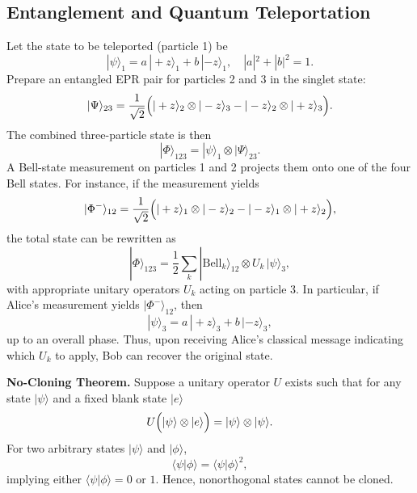 \documentclass[twocolumn]{article}
\begin{document}
\begin{spacing}{1}
\subsection{Entanglement and Quantum Teleportation}
Let the state to be teleported (particle 1) be
\[
|\psi\rangle_1 = a\,|+z\rangle_1 + b\,|-z\rangle_1,\quad |a|^2+|b|^2=1.
\]
Prepare an entangled EPR pair for particles 2 and 3 in the singlet state:
\[
|\Psi\rangle_{23} = \frac{1}{\sqrt{2}}\Bigl(|+z\rangle_2\otimes|-z\rangle_3 - |-z\rangle_2\otimes|+z\rangle_3\Bigr).
\]
The combined three-particle state is then
\[
|\Phi\rangle_{123} = |\psi\rangle_1\otimes|\Psi\rangle_{23}.
\]
A Bell-state measurement on particles 1 and 2 projects them onto one of the four Bell states. For instance, if the measurement yields
\[
|\Phi^-\rangle_{12} = \frac{1}{\sqrt{2}}\Bigl(|+z\rangle_1\otimes|-z\rangle_2 - |-z\rangle_1\otimes|+z\rangle_2\Bigr),
\]
the total state can be rewritten as
\[
|\Phi\rangle_{123} = \frac{1}{2}\sum_{k} |\text{Bell}_k\rangle_{12}\otimes U_k\,|\psi\rangle_3,
\]
with appropriate unitary operators \(U_k\) acting on particle 3. In particular, if Alice's measurement yields \(|\Phi^-\rangle_{12}\), then
\[
|\psi\rangle_3 = a\,|+z\rangle_3 + b\,|-z\rangle_3,
\]
up to an overall phase. Thus, upon receiving Alice’s classical message indicating which \(U_k\) to apply, Bob can recover the original state.

\textbf{No-Cloning Theorem.} Suppose a unitary operator \(U\) exists such that for any state \(|\psi\rangle\) and a fixed blank state \(|e\rangle\)
\[
U\Bigl(|\psi\rangle\otimes|e\rangle\Bigr)=|\psi\rangle\otimes|\psi\rangle.
\]
For two arbitrary states \(|\psi\rangle\) and \(|\phi\rangle\),
\[
\langle\psi|\phi\rangle = \langle\psi|\phi\rangle^2,
\]
implying either \(\langle\psi|\phi\rangle=0\) or \(1\). Hence, nonorthogonal states cannot be cloned.


\end{spacing}
\end{document}
